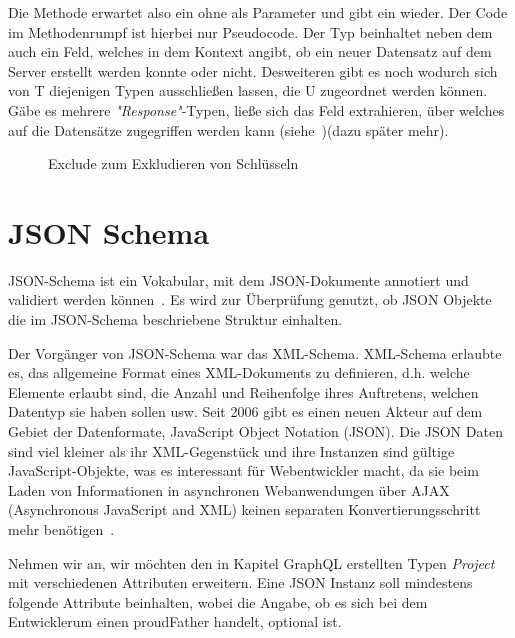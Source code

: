 Die Methode  erwartet also ein  ohne  als Parameter und gibt ein  wieder.
Der Code im Methodenrumpf ist hierbei nur Pseudocode. Der Typ  beinhaltet neben dem  auch ein  Feld,
welches in dem Kontext angibt, ob ein neuer Datensatz auf dem Server erstellt werden konnte oder nicht.
Desweiteren gibt es noch  wodurch sich von T diejenigen Typen ausschließen lassen,
die U zugeordnet werden können. Gäbe es mehrere \emph{"Response"}-Typen, ließe sich das Feld extrahieren,
über welches auf die Datensätze zugegriffen werden kann (siehe~)(dazu später mehr).

\begin{figure}[h]
    
    \caption{Exclude zum Exkludieren von Schlüsseln}
    \label{fig:basics:typescript:6}
\end{figure}


\section{JSON Schema}
\label{sec:basics:jsonschema}
JSON-Schema ist ein Vokabular, mit dem JSON-Dokumente  annotiert und validiert werden können~\cite{json-schema}.
Es wird zur Überprüfung genutzt, ob JSON Objekte die im JSON-Schema beschriebene Struktur einhalten.

Der Vorgänger von JSON-Schema war das XML-Schema.
XML-Schema erlaubte es, das allgemeine Format eines XML-Dokuments zu definieren,
d.h. welche Elemente erlaubt sind, die Anzahl und Reihenfolge ihres Auftretens, welchen Datentyp sie haben sollen usw.
Seit 2006 gibt es einen neuen Akteur auf dem Gebiet der Datenformate, JavaScript Object Notation (JSON).
Die JSON Daten sind viel kleiner als ihr XML-Gegenstück und ihre Instanzen sind gültige JavaScript-Objekte, was es interessant für Webentwickler macht, da sie beim Laden von
Informationen in asynchronen Webanwendungen über AJAX (Asynchronous JavaScript and XML) keinen separaten Konvertierungsschritt mehr benötigen~\cite{json-schema-xml}.

Nehmen wir an, wir möchten den in Kapitel GraphQL erstellten Typen \emph{Project}~ mit verschiedenen Attributen erweitern.
Eine JSON Instanz soll mindestens folgende Attribute beinhalten, wobei die Angabe, ob es sich bei dem Entwicklerum einen proudFather handelt, optional ist.

